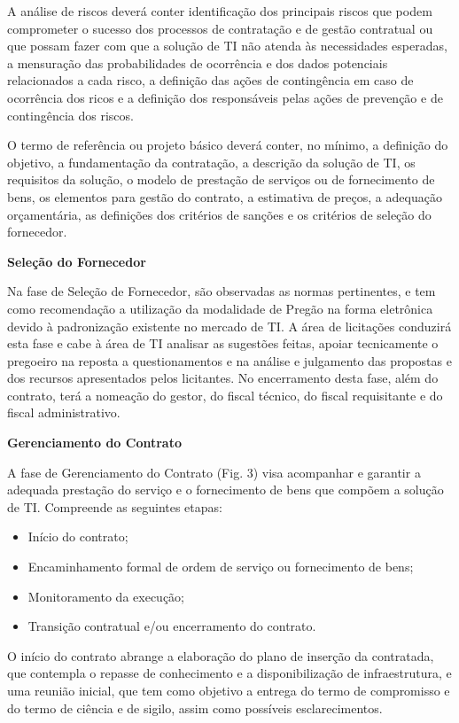 A análise de riscos deverá conter identificação dos principais riscos que podem comprometer o sucesso dos processos de contratação e de gestão contratual ou que possam fazer com que a solução de TI não atenda às necessidades esperadas, a mensuração das probabilidades de ocorrência e dos dados potenciais relacionados a cada risco, a definição das ações de contingência em caso de ocorrência dos ricos e a definição dos responsáveis pelas ações de prevenção e de contingência dos riscos.

O termo de referência ou projeto básico deverá conter, no mínimo, a definição do objetivo, a fundamentação da contratação, a descrição da solução de TI, os requisitos da solução, o modelo de prestação de serviços ou de fornecimento de bens, os elementos para gestão do contrato, a estimativa de preços, a adequação orçamentária, as definições dos critérios de sanções e os critérios de seleção do fornecedor. 

\textbf {Seleção do Fornecedor}

Na fase de Seleção de Fornecedor, são observadas as normas pertinentes, e tem como recomendação a utilização da modalidade de Pregão na forma eletrônica devido à padronização existente no mercado de TI.  A área de licitações conduzirá esta fase e cabe à área de TI analisar as sugestões feitas, apoiar tecnicamente o pregoeiro na reposta a questionamentos e na análise e julgamento das propostas e dos recursos apresentados pelos licitantes. No encerramento desta fase, além do contrato, terá a nomeação do gestor, do fiscal técnico, do fiscal requisitante e do fiscal administrativo.

\textbf {Gerenciamento do Contrato}

A fase de Gerenciamento do Contrato (Fig. 3) visa acompanhar e garantir a adequada prestação do serviço e o fornecimento de bens que compõem a solução de TI. Compreende as seguintes etapas: \begin{itemize}
\item Início do contrato; 
\item Encaminhamento formal de ordem de serviço ou fornecimento de bens; 
\item Monitoramento da execução; 
\item Transição contratual e/ou encerramento do contrato. 
\end{itemize}

O início do contrato abrange a elaboração do plano de inserção da contratada, que contempla o repasse de conhecimento e a disponibilização de infraestrutura, e uma reunião inicial, que tem como objetivo a entrega do termo de compromisso e do termo de ciência e de sigilo, assim como possíveis esclarecimentos. 


